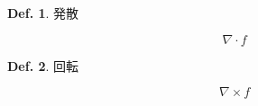 \documentclass[a4paper,10pt,report]{amsart}
\theoremstyle{plain}
\theoremstyle{definition}
\newtheorem{defn}{Def.}[section]
\theoremstyle{remark}
\begin{document}
    \begin{leftbar}
        \begin{defn}発散\par
            \begin{equation}
                \nabla{}\cdot{}f
            \end{equation}
        \end{defn}
    \end{leftbar}
    \begin{leftbar}
        \begin{defn}回転\par
            \begin{equation}
                \nabla{}\times{}f
            \end{equation}
        \end{defn}
    \end{leftbar}
\end{document}
